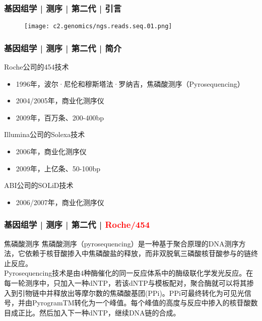 \begin{frame}
  \frametitle{基因组学 | 测序 | 第二代 | 引言}
  \begin{figure}
    \centering
    \texttt{[image: c2.genomics/ngs.reads.seq.01.png]}
  \end{figure}
\end{frame}

\begin{frame}
  \frametitle{基因组学 | 测序 | 第二代 | 简介}
  \begin{block}{Roche公司的454技术}
  \begin{itemize}
    \item 1996年，波尔·尼伦和穆斯塔法·罗纳吉，焦磷酸测序（Pyrosequencing）
    \item 2004/2005年，商业化测序仪
    \item 2009年，百万条、200-400bp
  \end{itemize}
  \end{block}
  \pause
  \begin{block}{Illumina公司的Solexa技术}
  \begin{itemize}
    \item 2006年，商业化测序仪
    \item 2009年，上亿条、50-100bp
  \end{itemize}
  \end{block}
  \pause
  \begin{block}{ABI公司的SOLiD技术}
  \begin{itemize}
    \item 2006/2007年，商业化测序仪
  \end{itemize}
  \end{block}
\end{frame}

\begin{frame}
  \frametitle{基因组学 | 测序 | 第二代 | \textcolor{red}{Roche/454}}
  \begin{block}{焦磷酸测序}
焦磷酸测序（pyrosequencing）是一种基于聚合原理的DNA测序方法，它依赖于核苷酸掺入中焦磷酸盐的释放，而非双脱氧三磷酸核苷酸参与的链终止反应。\\
\vspace{1em}
Pyrosequencing技术是由4种酶催化的同一反应体系中的酶级联化学发光反应。在每一轮测序中，只加入一种dNTP，若该dNTP与模板配对，聚合酶就可以将其掺入到引物链中并释放出等摩尔数的焦磷酸基团(PPi)。PPi可最终转化为可见光信号，并由PyrogramTM转化为一个峰值。每个峰值的高度与反应中掺入的核苷酸数目成正比。然后加入下一种dNTP，继续DNA链的合成。
  \end{block}
\end{frame}

